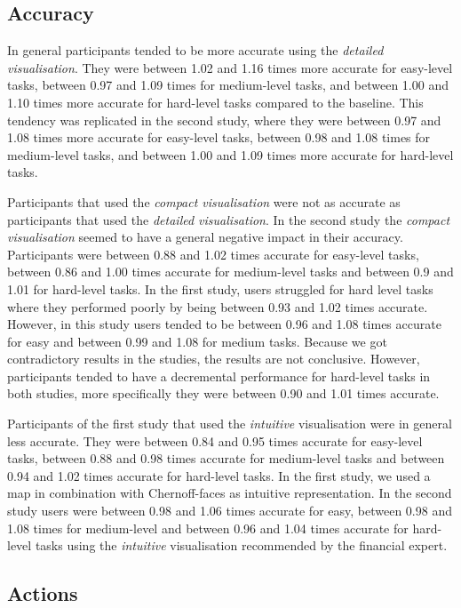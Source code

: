 \documentclass[final,5p,times,twocolumn,authoryear]{elsarticle}
\begin{document}
\subsection{Accuracy}
In general participants tended to be more accurate using the \emph{detailed visualisation}. They were between 1.02 and 1.16 times more accurate for easy-level tasks, between 0.97 and 1.09 times for medium-level tasks, and between 1.00 and 1.10 times more accurate for hard-level tasks compared to the baseline. This tendency was replicated in the second study, where they were between 0.97 and 1.08 times more accurate for easy-level tasks, between 0.98 and 1.08 times for medium-level tasks, and between 1.00 and 1.09 times more accurate for hard-level tasks. 

Participants that used the \emph{compact visualisation} were not as accurate as participants that used the  \emph{detailed visualisation}.  In the second study the  \emph{compact visualisation} seemed to have a general negative impact in their accuracy. Participants were between 0.88 and 1.02 times accurate for easy-level tasks, between 0.86 and 1.00 times accurate for medium-level tasks and between 0.9 and 1.01 for hard-level tasks. In the first study, users struggled for hard level tasks where they performed poorly by being between 0.93 and 1.02 times accurate. However, in this study users tended to be between 0.96 and 1.08 times accurate for easy and between 0.99 and 1.08 for medium tasks. Because we got contradictory results in the studies, the results are not conclusive. However, participants tended to have a decremental performance for hard-level tasks in both studies, more specifically they were between 0.90 and 1.01 times accurate. 

Participants of the first study that used the \emph{intuitive} visualisation were in general less accurate. They were between 0.84 and 0.95 times accurate for easy-level tasks, between 0.88 and 0.98 times accurate for medium-level tasks and between 0.94 and 1.02 times accurate for hard-level tasks. In the first study, we used a map in combination with Chernoff-faces as intuitive representation. In the second study users were between 0.98 and 1.06 times accurate for easy, between 0.98 and 1.08 times for medium-level and between 0.96 and 1.04 times accurate for hard-level tasks using the \emph{intuitive} visualisation recommended by the financial expert. 

\subsection{Actions}
\end{document}
